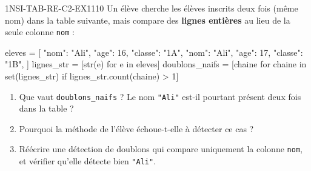 
\begin{exercice}{1NSI-TAB-RE-C2-EX1}{1}{10}
Un élève cherche les élèves inscrits deux fois (même nom) dans la table suivante, mais
compare des \textbf{lignes entières} au lieu de la seule colonne \lstinline{nom} :
\begin{python}
eleves = [
    {"nom": "Ali", "age": 16, "classe": "1A"},
    {"nom": "Ali", "age": 17, "classe": "1B"},
]
lignes_str = [str(e) for e in eleves]
doublons_naifs = [chaine for chaine in set(lignes_str) if lignes_str.count(chaine) > 1]
\end{python}
\begin{enumerate}
  \item Que vaut \lstinline{doublons_naifs} ? Le nom \lstinline{"Ali"} est-il pourtant présent deux fois dans la table ?
  \item Pourquoi la méthode de l'élève échoue-t-elle à détecter ce cas ?
  \item Réécrire une détection de doublons qui compare uniquement la colonne \lstinline{nom}, et vérifier qu'elle détecte bien \lstinline{"Ali"}.
\end{enumerate}
\end{exercice}

